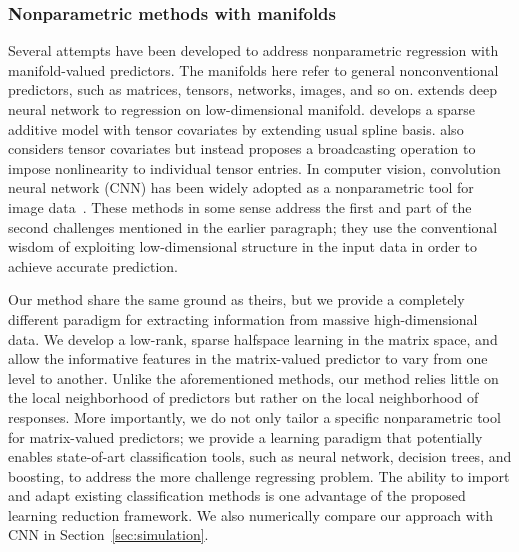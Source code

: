 \documentclass[11pt]{article}
\theoremstyle{plain}
\theoremstyle{definition}
\begin{document}
\subsubsection{Nonparametric methods with manifolds} 
Several attempts have been developed to address nonparametric regression with manifold-valued predictors. The manifolds here refer to general nonconventional predictors, such as matrices, tensors, networks, images, and so on. \cite{chen2019nonparametric} extends deep neural network to regression on low-dimensional manifold. \cite{hao2019sparse} develops a sparse additive model with tensor covariates by extending usual spline basis. \cite{zhou2020broadcasted} also considers tensor covariates but instead proposes a broadcasting operation to impose nonlinearity to individual tensor entries. In computer vision, convolution neural network (CNN) has been widely adopted as a nonparametric tool for image data~\citep{goodfellow2016deep}. 
These methods in some sense address the first and part of the second challenges mentioned in the earlier paragraph; they use the conventional wisdom of exploiting low-dimensional structure in the input data in order to achieve accurate prediction. 

Our method share the same ground as theirs, but we provide a completely different paradigm for extracting information from massive high-dimensional data. We develop a low-rank, sparse halfspace learning in the matrix space, and allow the informative features in the matrix-valued predictor to vary from one level to another. Unlike the aforementioned methods, our method relies little on the local neighborhood of predictors but rather on the local neighborhood of responses. More importantly, we do not only tailor a specific nonparametric tool for matrix-valued predictors; we provide a learning paradigm that potentially enables state-of-art classification tools, such as neural network, decision trees, and boosting, to address the more challenge regressing problem. The ability to import and adapt existing classification methods is one advantage of the proposed learning reduction framework.
We also numerically compare our approach with CNN in Section~\ref{sec:simulation}.
\end{document}
